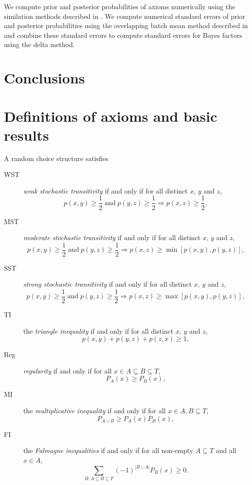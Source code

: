 \documentclass[11pt,letter]{article}
\begin{document}
We compute prior and posterior probabilities of axioms numerically using the similation methods described in .
We compute numerical standard errors of prior and posterior probabilities using the overlapping batch mean method described in  and combine these standard errors to compute standard errors for Bayes factors using the delta method.

\section{Conclusions}\label{s:conclude}

\appendix

\section{Definitions of axioms and basic results}\label{s:axioms}

A random choice structure satisfies
\begin{description}
	\item[WST] {\em weak stochastic transitivity} if and only if for all distinct
	$x$, $y$ and $z$,
	\[
		p(x,y) \geq \frac{1}{2}\;\mbox{and}\; p(y,z) \geq \frac{1}{2}
		\Rightarrow p(x,z) \geq \frac{1}{2},
	\]
	\item[MST] {\em moderate stochastic transitivity} if and only if for all distinct
	$x$, $y$ and $z$,
	\[
		p(x,y) \geq \frac{1}{2}\;\mbox{and}\; p(y,z) \geq \frac{1}{2}
		\Rightarrow p(x,z) \geq \min[ p(x,y), p(y,z) ],
	\]
	\item[SST] {\em strong stochastic transitivity} if and only if for all distinct
	$x$, $y$ and $z$,
	\[
		p(x,y) \geq \frac{1}{2}\;\mbox{and}\; p(y,z) \geq \frac{1}{2}
		\Rightarrow p(x,z) \geq \max[ p(x,y), p(y,z) ],
	\]
	\item[TI] the {\em triangle inequality} if and only if for all distinct
	$x$, $y$ and $z$,
	\[
		p(x,y) + p(y,z) + p(z,x) \geq 1,
	\]
	\item[Reg] {\em regularity} if and only if for all $x \in A \subseteq B \subseteq T$,
	\[
		P_A(x) \geq P_B(x),
	\]
	\item[MI] the {\em multiplicative inequality} if and only if for all $x \in A, B \subseteq T$,
	\[
		P_{A \cup B} \geq P_A(x) P_B(x),
	\]
	\item[FI] the {\em Falmagne inequalities} if and only if for all non-empty
	$A \subseteq T$ and all $x \in A$,
	\begin{equation}\label{e:BMP}
		\sum_{B \colon A \subseteq B \subseteq T} (-1)^{|B \backslash A|} P_B(x) \geq 0.
	\end{equation}
\end{description}
\end{document}
